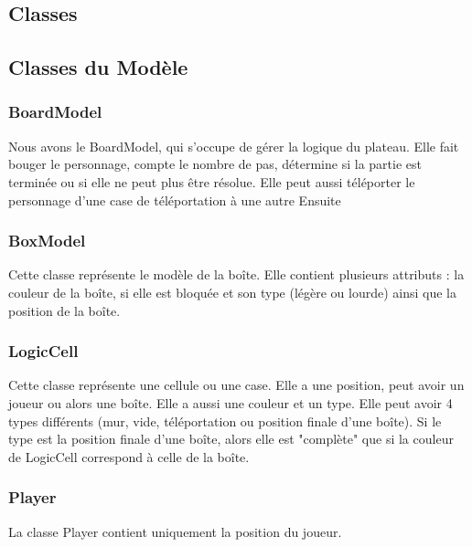 \documentclass[utf8]{article}
\begin{document}
\begin{large}
\par


\section{Classes}
\par
\indent

\par
\subsection{Classes du Modèle}

\subsubsection{BoardModel}
\par
\indent
Nous avons le BoardModel, qui s'occupe de gérer la logique du plateau. Elle fait
bouger le personnage, compte le nombre de pas, détermine si la partie est
terminée ou si elle ne peut plus être résolue. Elle peut aussi téléporter le
personnage d'une case de téléportation à une autre Ensuite
\par
\subsubsection{BoxModel}
\par
\indent
Cette classe représente le modèle de la boîte. Elle contient plusieurs attributs
: la couleur de la boîte, si elle est bloquée et son type (légère ou lourde)
ainsi que la position de la boîte.
\par
\subsubsection{LogicCell}
\par
\indent
Cette classe représente une cellule ou une case. Elle a une position, peut avoir
un joueur ou alors une boîte. Elle a aussi une couleur et un type. Elle peut
avoir 4 types différents (mur, vide, téléportation ou position finale d'une
boîte). Si le type est la position finale d'une boîte, alors elle est "complète"
que si la couleur de LogicCell correspond à celle de la boîte.
\par
\subsubsection{Player}
\par
\indent
La classe Player contient uniquement la position du joueur.
\par

\end{large}
\end{document}
